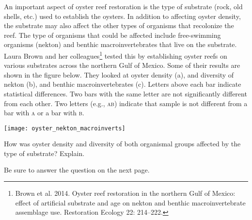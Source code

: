 An important aspect of oyster reef restoration is the type of substrate (rock, old shells, etc.) used to establish the oysters. In addition to affecting oyster density, the substrate may also affect the other types of organisms that recolonize the reef. The type of organisms that could be affected include free-swimming organisms (nekton) and benthic macroinvertebrates that live on the substrate. Laura Brown and her colleagues\footnote{Brown et al. 2014. Oyster reef restoration in the northern Gulf of Mexico: effect of artificial substrate and age on nekton and benthic macroinvertebrate assemblage use. Restoration Ecology 22: 214--222.} tested this by establishing oyster reefs on various substrates across the northern Gulf of Mexico. Some of their results are shown in the figure below. They looked at oyster density (a), and diversity of nekton (b), and benthic macroinvertebrates (c). Letters above each bar indicate statistical differences. Two bars with the same letter are not significantly different from each other. Two letters (e.g., \textsc{ab}) indicate that sample is not different from a bar with \textsc{a} or a bar with \textsc{b}.

\texttt{[image: oyster\_nekton\_macroinverts]}

\question[5]\label{question:project}
How was oyster density and diversity of both organismal groups affected by the type of substrate? Explain.


{\footnotesize Be sure to answer the question on the next page.}

\newpage
